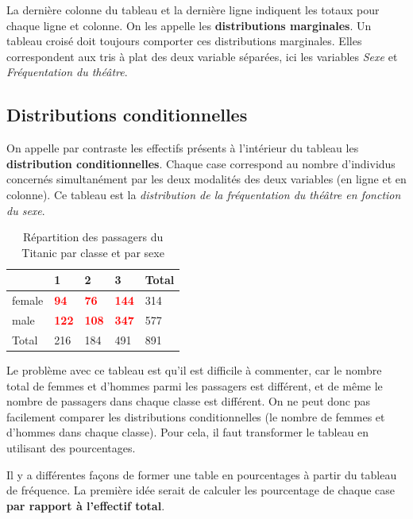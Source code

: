 \documentclass[
]{book}
\begin{document}
La dernière colonne du tableau et la dernière ligne indiquent les totaux pour chaque ligne et colonne. On les appelle les \textbf{distributions marginales}. Un tableau croisé doit toujours comporter ces distributions marginales. Elles correspondent aux tris à plat des deux variable séparées, ici les variables \emph{Sexe} et \emph{Fréquentation du théâtre}.

\hypertarget{distributions-conditionnelles}{%
\subsection{Distributions conditionnelles}\label{distributions-conditionnelles}}

On appelle par contraste les effectifs présents à l'intérieur du tableau les \textbf{distribution conditionnelles}. Chaque case correspond au nombre d'individus concernés simultanément par les deux modalités des deux variables (en ligne et en colonne). Ce tableau est la \emph{distribution de la fréquentation du théâtre en fonction du sexe}.

\begin{table}

\caption{\label{tab:unnamed-chunk-16}Répartition des passagers du Titanic par classe et par sexe}
\centering
\begin{tabular}[t]{l|l|l|l|l}
\hline
  & 1 & 2 & 3 & Total\\
\hline
female & \textcolor{red}{\textbf{94}} & \textcolor{red}{\textbf{76}} & \textcolor{red}{\textbf{144}} & 314\\
\hline
male & \textcolor{red}{\textbf{122}} & \textcolor{red}{\textbf{108}} & \textcolor{red}{\textbf{347}} & 577\\
\hline
Total & 216 & 184 & 491 & 891\\
\hline
\end{tabular}
\end{table}

Le problème avec ce tableau est qu'il est difficile à commenter, car le nombre total de femmes et d'hommes parmi les passagers est différent, et de même le nombre de passagers dans chaque classe est différent. On ne peut donc pas facilement comparer les distributions conditionnelles (le nombre de femmes et d'hommes dans chaque classe). Pour cela, il faut transformer le tableau en utilisant des pourcentages.

Il y a différentes façons de former une table en pourcentages à partir du tableau de fréquence. La première idée serait de calculer les pourcentage de chaque case \textbf{par rapport à l'effectif total}.
\end{document}
